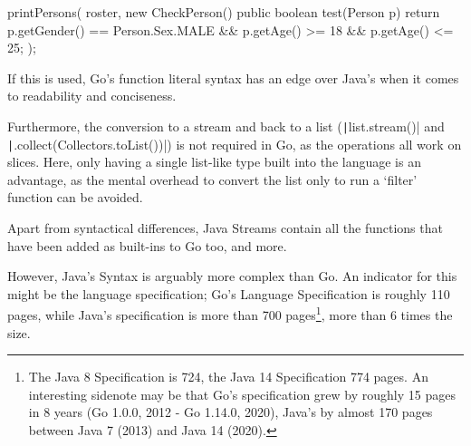 \begin{javacode}
printPersons(
    roster,
    new CheckPerson() {
        public boolean test(Person p) {
            return p.getGender() == Person.Sex.MALE
                && p.getAge() >= 18
                && p.getAge() <= 25;
        }
    }
);
\end{javacode}
\autocite{java-lambda-expressions}

If this is used, Go's function literal syntax has an edge over Java's when it comes to
readability and conciseness.

Furthermore, the conversion to a stream and back to a list
(\texttt|list.stream()| and \texttt|.collect(Collectors.toList())|)
is not required in Go, as the operations all work on slices. Here, only having a single
list-like type built into the language is an advantage, as the mental overhead to convert
the list only to run a `filter' function can be avoided.

Apart from syntactical differences, Java Streams contain all the functions that
have been added as built-ins to Go too, and more.

However, Java's Syntax is arguably more complex than Go. An indicator for this might be
the language specification; Go's Language Specification is roughly 110 pages, while
Java's specification is more than 700 pages\footnote{
	The Java 8 Specification is 724\autocite{java-8-spec}, the Java 14
	Specification 774\autocite{java-14-spec} pages. An interesting sidenote may
	be that Go's specification grew by roughly 15 pages in 8 years (Go 1.0.0, 2012 - Go
	1.14.0, 2020), Java's by almost 170 pages between Java 7 (2013) and Java 14 (2020).
},
more than 6 times the size.
